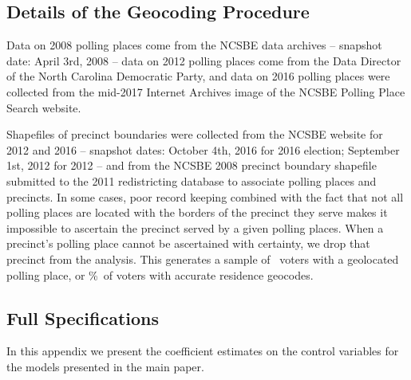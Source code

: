 \documentclass[12pt]{article}
\begin{document}
\clearpage \newpage
\subsection{Details of the Geocoding Procedure}\label{appendix_geocoding}
\setcounter{table}{0}
\setcounter{figure}{0}
\renewcommand{\thetable}{B\arabic{table}}
\renewcommand{\thefigure}{B\arabic{figure}}

Data on 2008 polling places come from the NCSBE data archives -- snapshot date: April 3rd, 2008 --  data on 2012 polling places come from the Data Director of the North Carolina Democratic Party, and data on 2016 polling places were collected from the mid-2017 Internet Archives image of the NCSBE Polling Place Search website.

Shapefiles of precinct boundaries were collected from the NCSBE website for 2012 and 2016 -- snapshot dates: October 4th, 2016 for 2016 election; September 1st, 2012 for 2012 -- and from the NCSBE 2008 precinct boundary shapefile submitted to the 2011 redistricting database to associate polling places and precincts. In some cases, poor record keeping combined with the fact that not all polling places are located with the borders of the precinct they serve makes it impossible to ascertain the precinct served by a given polling places. When a precinct's polling place cannot be ascertained with certainty, we drop that precinct from the analysis. This generates a sample of \unskip~voters with a geolocated polling place, or \unskip\%~of voters with accurate residence geocodes.




\clearpage \newpage
\subsection{Full Specifications}\label{appendix_maintargeting}
\setcounter{table}{0}
\setcounter{figure}{0}
\renewcommand{\thetable}{C\arabic{table}}
\renewcommand{\thefigure}{C\arabic{figure}}


In this appendix we present the coefficient estimates on the control variables for the models presented in the main paper.
\end{document}
